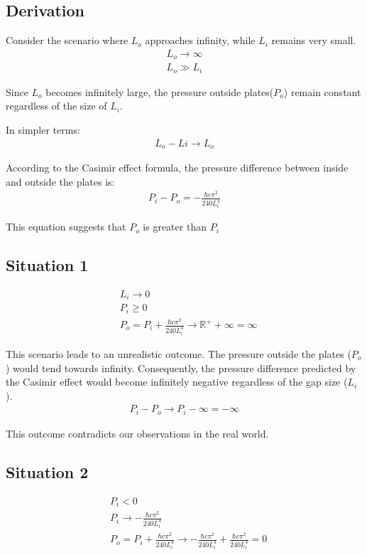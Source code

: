 \documentclass[aip,apl,amsmath,amssymb,reprint]{revtex4-2}
\begin{document}
\subsection*{Derivation}
Consider the scenario where  $L_o$ approaches infinity, while $L_i$ remains very small.
\begin{align}
    L_o \rightarrow \infty \\
    L_o \gg L_i
\end{align}

Since $L_o$ becomes infinitely large, the pressure outside plates($P_o$) remain constant regardless of the size of $L_i$.

\noindent In simpler terms:
\begin{align}L_o - Li \rightarrow L_o\end{align}

According to the Casimir effect formula\citep*{Casimir:1948dh}, the pressure difference between inside and outside the plates is:
\begin{align}P_i - P_o = -\frac{\hbar c \pi^2}{240 L_i^4}\end{align}

This equation suggests that $P_o$ is greater than $P_i$

\subsection*{Situation 1}
\begin{align}
    &L_i \rightarrow 0 \\
    &P_i \ge 0 \\
    &P_o = P_i + \frac{\hbar c \pi^2}{240 L_i^4} \rightarrow {\mathbb{R}}^+ + \infty = \infty
\end{align}

This scenario leads to an unrealistic outcome. The pressure outside the plates ($P_o$) would tend towards infinity.
Consequently, the pressure difference predicted by the Casimir effect would become infinitely negative regardless of the gap size ($L_i$).
\begin{align}P_i - P_o \rightarrow P_i - \infty = - \infty\end{align}

This outcome contradicts our observations in the real world.

\subsection*{Situation 2}
\begin{align}
    &P_i < 0 \\
    &P_i \rightarrow -\frac{\hbar c \pi^2}{240 L_i^4} \\
    &P_o = P_i + \frac{\hbar c \pi^2}{240 L_i^4} \rightarrow -\frac{\hbar c \pi^2}{240 L_i^4} + \frac{\hbar c \pi^2}{240 L_i^4} = 0
\end{align}
\end{document}
